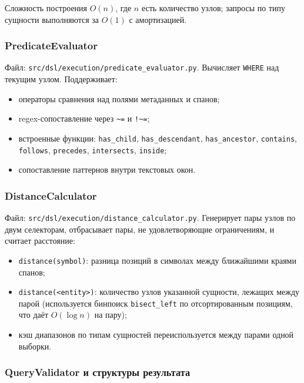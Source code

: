 \documentclass[12pt,a4paper]{article}
\newcommand{\code}[1]{\texttt{#1}}
\begin{document}
Сложность построения \(O(n)\), где \(n\) есть количество узлов; запросы
по типу сущности выполняются за \(O(1)\) с амортизацией.

\subsubsection{PredicateEvaluator}

Файл: \code{src/dsl/execution/predicate\_evaluator.py}. Вычисляет
\code{WHERE} над текущим узлом. Поддерживает:

\begin{itemize}
  \item операторы сравнения над полями метаданных и спанов;
  \item regex-сопоставление через \code{\textasciitilde =} и
        \code{!\textasciitilde =};
  \item встроенные функции: \code{has\_child}, \code{has\_descendant},
        \code{has\_ancestor}, \code{contains}, \code{follows},
        \code{precedes}, \code{intersects}, \code{inside};
  \item сопоставление паттернов внутри текстовых окон.
\end{itemize}

\subsubsection{DistanceCalculator}

Файл: \code{src/dsl/execution/distance\_calculator.py}. Генерирует пары
узлов по двум селекторам, отбрасывает пары, не удовлетворяющие
ограничениям, и считает расстояние:

\begin{itemize}
  \item \code{distance(symbol)}: разница позиций в символах
        между ближайшими краями спанов;
  \item \code{distance(<entity>)}: количество узлов указанной
        сущности, лежащих между парой (используется бинпоиск
        \code{bisect\_left} по отсортированным позициям, что даёт
        \(O(\log n)\) на пару);
  \item кэш диапазонов по типам сущностей переиспользуется между
        парами одной выборки.
\end{itemize}

\subsubsection{QueryValidator и структуры результата}
\end{document}
